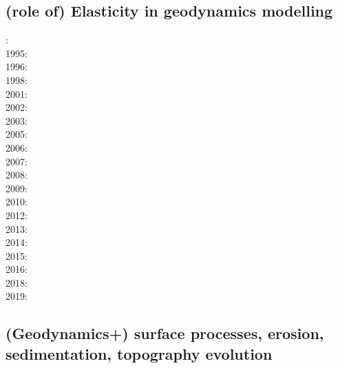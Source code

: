 \subsection{(role of) Elasticity in geodynamics modelling}

{\scriptsize
{}:\cite{yusa84}\\
1995:\cite{budi95}\\
1996:\cite{hach96}\\
1998:\cite{copo98}\\
2001:\cite{vapy01}\\
2002:\cite{mumh02}\cite{modm02}\\
2003:\cite{hukm03}\cite{wabu03}\\
2005:\cite{mure05}\\
2006:\cite{kapo06}\cite{mudm06}\\
2007:\cite{kabe07}\\
2008:\cite{baso08}\cite{fukk08}\\
2009:\cite{qurj09}\\
2010:\cite{bepo10}\\
2012:\cite{gerb12}\cite{kasc12}\\
2013:\cite{wahd13}\\
2014:\cite{famc14}\cite{fogm14}\\
2015:\cite{thkp15}\\
2016:\cite{bafl16}\cite{jads16}\cite{olbm16}\cite{bafl16}\\
2018:\cite{dusd18}\\
2019:\cite{pact19}
}

\subsection{(Geodynamics+) surface processes, erosion, sedimentation, topography evolution}

